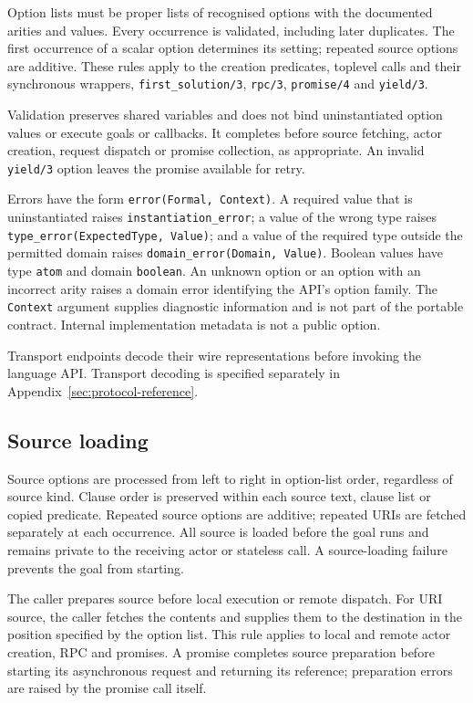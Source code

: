 Option lists must be proper lists of recognised options with the documented
arities and values. Every occurrence is validated, including later duplicates.
The first occurrence of a scalar option determines its setting; repeated
source options are additive. These rules apply to the creation predicates,
toplevel calls and their synchronous wrappers,
\texttt{first\_\allowbreak{}solution/\allowbreak{}3},
\texttt{rpc/\allowbreak{}3}, \texttt{promise/\allowbreak{}4} and
\texttt{yield/\allowbreak{}3}.

Validation preserves shared variables and does not bind uninstantiated option
values or execute goals or callbacks. It completes before source fetching,
actor creation, request dispatch or promise collection, as appropriate.
An invalid \texttt{yield/\allowbreak{}3} option leaves the promise available
for retry.

Errors have the form \texttt{error(Formal, Context)}. A required value that is
uninstantiated raises \texttt{instantiation\_error}; a value of the wrong type
raises \texttt{type\_error(ExpectedType, Value)}; and a value of the required
type outside the permitted domain raises
\texttt{domain\_error(Domain, Value)}. Boolean values have type \texttt{atom}
and domain \texttt{boolean}. An unknown option or an option with an incorrect
arity raises a domain error identifying the API's option family. The
\texttt{Context} argument supplies diagnostic information and is not part of
the portable contract. Internal implementation metadata is not a public option.

Transport endpoints decode their wire representations before invoking the
language API. Transport decoding is specified separately in
Appendix~\ref{sec:protocol-reference}.

\subsection{Source loading}\label{sec:manual-sources}
Source options are processed from left to right in option-list order,
regardless of source kind. Clause order is preserved within each source text,
clause list or copied predicate. Repeated source options are additive;
repeated URIs are fetched separately at each occurrence. All source is loaded
before the goal runs and remains private to the receiving actor or stateless
call. A source-loading failure prevents the goal from starting.

The caller prepares source before local execution or remote dispatch. For
URI source, the caller fetches the contents and supplies them to the
destination in the position specified by the option list. This rule applies
to local and remote actor creation, RPC and promises. A promise completes
source preparation before starting its asynchronous request and returning its
reference; preparation errors are raised by the promise call itself.

